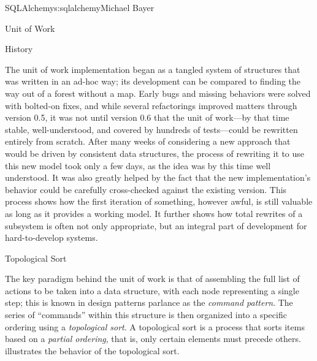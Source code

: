 \begin{aosachapter}{SQLAlchemy}{s:sqlalchemy}{Michael Bayer}
\begin{aosasect1}{Unit of Work}
\begin{aosasect2}{History}

The unit of work implementation began as a tangled system of structures that
was written in an ad-hoc way; its development can be compared to finding
the way out of a forest without a map. Early bugs and missing behaviors were
solved with bolted-on fixes, and while several refactorings improved matters
through version 0.5, it was not until version 0.6 that the unit of work---by
that time stable, well-understood, and covered by hundreds of tests---could be
rewritten entirely from scratch.  After many weeks of considering a new
approach that would be driven by consistent data structures, the process of
rewriting it to use this new model took only a few days, as the idea was
by this time well understood.  It was also
greatly helped by the fact that the new implementation's behavior could be
carefully cross-checked against the existing version. This process shows how
the first iteration of something, however awful, is still valuable as long as
it provides a working model.  It further shows how total rewrites of a subsystem
is often not only appropriate, but an integral part of development for
hard-to-develop systems.

\end{aosasect2}

\begin{aosasect2}{Topological Sort}

The key paradigm behind the unit of work is that of assembling the full list of
actions to be taken into a data structure, with each node representing a single step;
this is known in design patterns parlance as the \emph{command pattern}.   The series of
``commands'' within this structure is then organized into a specific ordering
using a \emph{topological sort}.   A topological sort is a process that sorts items based on a \emph{partial ordering},
that is, only certain elements must precede others.   illustrates the
behavior of the topological sort.



\end{aosasect2}
\end{aosasect1}
\end{aosachapter}
